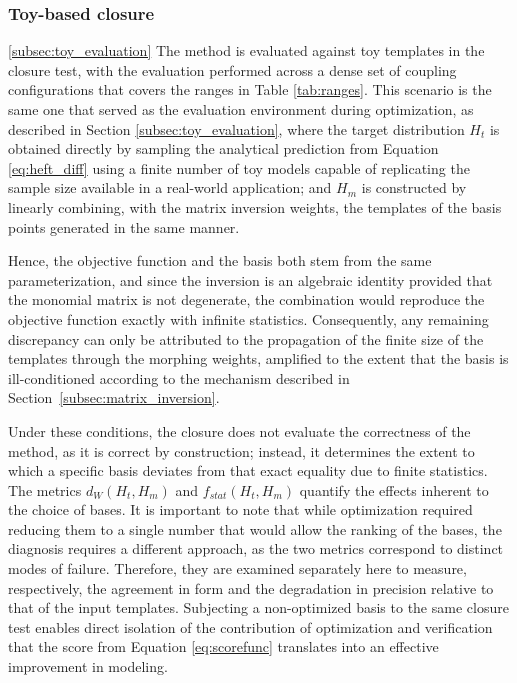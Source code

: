 \subsubsection{Toy-based closure}
\ref{subsec:toy_evaluation}
The method is evaluated against toy templates in the closure test, with the evaluation performed across a dense set of coupling configurations that covers the ranges in Table \ref{tab:ranges}. This scenario is the same one that served as the evaluation environment during optimization, as described in Section \ref{subsec:toy_evaluation}, where the target distribution $H_t$ is obtained directly by sampling the analytical prediction from Equation \ref{eq:heft_diff} using a finite number of toy models capable of replicating the sample size available in a real-world application; and $H_m$ is constructed by linearly combining, with the matrix inversion weights, the templates of the basis points generated in the same manner.

Hence, the objective function and the basis both stem from the same parameterization, and since the inversion is an algebraic identity provided that the monomial matrix is not degenerate, the combination would reproduce the objective function exactly with infinite statistics. Consequently, any remaining discrepancy can only be attributed to the propagation of the finite size of the templates through the morphing weights, amplified to the extent that the basis is ill-conditioned according to the mechanism described in Section~\ref{subsec:matrix_inversion}.\medskip

Under these conditions, the closure does not evaluate the correctness of the method, as it is correct by construction; instead, it determines the extent to which a specific basis deviates from that exact equality due to finite statistics. The metrics $d_W(H_{t},H_{m})$ and $f_{stat}(H_{t},H_{m})$ quantify the effects inherent to the choice of bases. It is important to note that while optimization required reducing them to a single number that would allow the ranking of the bases, the diagnosis requires a different approach, as the two metrics correspond to distinct modes of failure. Therefore, they are examined separately here to measure, respectively, the agreement in form and the degradation in precision relative to that of the input templates. Subjecting a non-optimized basis to the same closure test enables direct isolation of the contribution of optimization and verification that the score from Equation \ref{eq:scorefunc} translates into an effective improvement in modeling.

